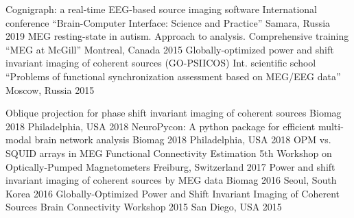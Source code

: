 \begin{cventries}
  \cvconf
    {Cognigraph: a real-time EEG-based source imaging software}
    {International conference ``Brain-Computer Interface: Science and Practice''}
    {Samara, Russia}
    {2019}
  \cvconf
    {MEG resting-state in autism. Approach to analysis.}
    {Comprehensive training ``MEG at McGill''}
    {Montreal, Canada}
    {2015}
  \cvconf
  {Globally-optimized power and shift invariant imaging of coherent sources (GO-PSIICOS)}
    {Int. scientific school ``Problems of functional synchronization assessment based on MEG/EEG data''}
    {Moscow, Russia}
    {2015}
\end{cventries}
\begin{cventries}
    \cvconf
    {Oblique projection for phase shift invariant imaging of coherent sources}
    {Biomag 2018}
    {Philadelphia, USA}
    {2018}
    \cvconf
    {NeuroPycon: A python package for efficient multi-modal brain network analysis}
    {Biomag 2018}
    {Philadelphia, USA}
    {2018}
    \cvconf
    {OPM vs. SQUID arrays in MEG Functional Connectivity Estimation}
    {5th Workshop on Optically-Pumped Magnetometers}
    {Freiburg, Switzerland}
    {2017}
    \cvconf
    {Power and shift invariant imaging of coherent sources by MEG data}
    {Biomag 2016}
    {Seoul, South Korea}
    {2016}
    \cvconf
    {Globally-Optimized Power and Shift Invariant Imaging of Coherent Sources}
    {Brain Connectivity Workshop 2015}
    {San Diego, USA}
    {2015}
\end{cventries}
